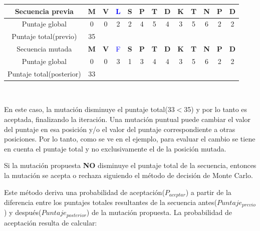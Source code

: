 \begin{enumerate}
\vspace{0.3cm}
\begin{center}
       \begin{tabular}{ccccccccccccc}
       \hline
       
	Secuencia previa &  \textbf{M} & \textbf{V} & \textcolor{blue}{L} & \textbf{S} & \textbf{P} & \textbf{T} & \textbf{D} & \textbf{K} & \textbf{T} & \textbf{N} & \textbf{P} & \textbf{D}\\  \hline
	Puntaje global & 0 & 0 & 2 & 2 & 4 & 5 & 4 & 3 & 5 & 6 & 2 & 2\\  \hline
       Puntaje total(previo) & 35 \\ \hline \hline
       Secuencia mutada & \textbf{M} & \textbf{V} & \textcolor{blue}{F} & \textbf{S} & \textbf{P} & \textbf{T} & \textbf{D} & \textbf{K} & \textbf{T} & \textbf{N} & \textbf{P} & \textbf{D}\\  \hline
	Puntaje global  & 0 & 0 & 3 & 1 & 3 & 4 & 4 & 3 & 5 & 6 & 2 & 2\\  \hline
       Puntaje total(posterior) & 33 \\  \hline
      \end{tabular}\\
\end{center}      
    En este caso, la mutación disminuye el puntaje total(33$<$35) y por lo tanto es aceptada, finalizando la iteración.
    Una mutación puntual puede cambiar el valor del puntaje en esa posición y/o el valor del puntaje correspondiente a otras posiciones. 
    Por lo tanto, como se ve en el ejemplo, para evaluar el cambio se tiene en cuenta el puntaje total y no exclusivamente el de la posición mutada. 
    
    
    Si la mutación propuesta \textbf{NO} disminuye el puntaje total de la secuencia, entonces la mutación se acepta o rechaza siguiendo el método de decisión de Monte Carlo. 
    
    Este método deriva una probabilidad de aceptación($P_{aceptar}$) a partir de la diferencia entre los puntajes totales resultantes de la secuencia antes($Puntaje_{previo}$) y después($Puntaje_{posterior}$) de la mutación propuesta.
    La probabilidad de aceptación resulta de calcular:
  

\end{enumerate}
